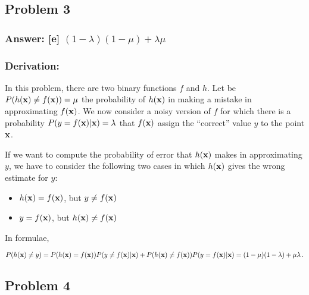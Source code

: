 \documentclass[11pt]{article}
\begin{document}
    \hypertarget{problem-3}{%
\subsection{Problem 3}\label{problem-3}}

\hypertarget{answer-e-1-lambda1-mulambdamu}{%
\subsubsection{\texorpdfstring{Answer: {[}e{]}
\((1-\lambda)(1-\mu)+\lambda\mu\)}{Answer: {[}e{]} (1-\textbackslash{}lambda)(1-\textbackslash{}mu)+\textbackslash{}lambda\textbackslash{}mu}}\label{answer-e-1-lambda1-mulambdamu}}

\hypertarget{derivation}{%
\subsubsection{Derivation:}\label{derivation}}

In this problem, there are two binary functions \(f\) and \(h\). Let be
\(P(h({\bf x})\neq f({\bf x}))=\mu\) the probability of \(h({\bf x})\)
in making a mistake in approximating \(f({\bf x})\). We now consider a
noisy version of \(f\) for which there is a probability
\(P(y = f({\bf x})|{\bf x})=\lambda\) that \(f({\bf x})\) assign the
``correct'' value \(y\) to the point \({\bf x}\).

If we want to compute the probability of error that \(h({\bf x})\) makes
in approximating \(y\), we have to consider the following two cases in
which \(h({\bf x})\) gives the wrong estimate for \(y\):

\begin{itemize}
\item
  \(h({\bf x})=f({\bf x})\), but \(y\neq f({\bf x})\)
\item
  \(y = f({\bf x})\), but \(h({\bf x})\neq f({\bf x})\)
\end{itemize}

In formulae,

\[
P(h({\bf x})\neq y)= P(h({\bf x}) = f({\bf x}))P(y \neq f({\bf x})|{\bf x})+P(h({\bf x})\neq f({\bf x}))P(y = f({\bf x})|{\bf x})\\=(1-\mu)(1-\lambda)+\mu\lambda\,.
\]

    \hypertarget{problem-4}{%
\subsection{Problem 4}\label{problem-4}}
\end{document}
